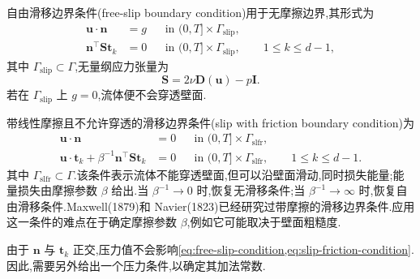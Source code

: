 \begin{note}[自由滑移与带摩擦滑移边界条件]\label{note:slip-boundary-conditions}
自由滑移边界条件(free-slip boundary condition)用于无摩擦边界,其形式为
\begin{equation}\label{eq:free-slip-condition}
\begin{aligned}
  \bm{u}\cdot\bm{n}&=g
    &&\text{in }(0,T]\times\Gamma_{\mathrm{slip}},\\
  \bm{n}^{\top}\bm{S}\bm{t}_k&=0
    &&\text{in }(0,T]\times\Gamma_{\mathrm{slip}},
      \qquad 1\leq k\leq d-1,
\end{aligned}
\end{equation}
其中 $\Gamma_{\mathrm{slip}}\subset\Gamma$,无量纲应力张量为
\begin{equation}\label{eq:dimensionless-stress-tensor}
  \bm{S}=2\nu\bm{D}(\bm{u})-p\bm{I}.
\end{equation}
若在 $\Gamma_{\mathrm{slip}}$ 上 $g=0$,流体便不会穿透壁面.

带线性摩擦且不允许穿透的滑移边界条件(slip with friction boundary condition)为
\begin{equation}\label{eq:slip-friction-condition}
\begin{aligned}
  \bm{u}\cdot\bm{n}&=0
     &&\text{in }(0,T]\times\Gamma_{\mathrm{slfr}},\\
  \bm{u}\cdot\bm{t}_k
    +\beta^{-1}\bm{n}^{\top}\bm{S}\bm{t}_k&=0
     &&\text{in }(0,T]\times\Gamma_{\mathrm{slfr}},
       \qquad 1\leq k\leq d-1.
\end{aligned}
\end{equation}
其中 $\Gamma_{\mathrm{slfr}}\subset\Gamma$.该条件表示流体不能穿透壁面,但可以沿壁面滑动,同时损失能量;能量损失由摩擦参数 $\beta$ 给出.当 $\beta^{-1}\to0$ 时,恢复无滑移条件;当 $\beta^{-1}\to\infty$ 时,恢复自由滑移条件.Maxwell(1879)和 Navier(1823)已经研究过带摩擦的滑移边界条件.应用这一条件的难点在于确定摩擦参数 $\beta$,例如它可能取决于壁面粗糙度.

由于 $\bm{n}$ 与 $\bm{t}_k$ 正交,压力值不会影响\cref{eq:free-slip-condition,eq:slip-friction-condition}.因此,需要另外给出一个压力条件,以确定其加法常数.
\end{note}


